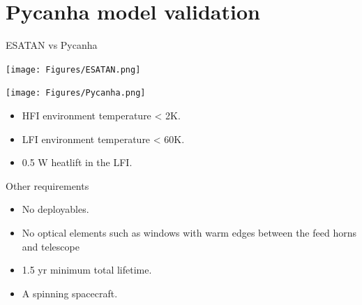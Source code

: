 \documentclass{cubeamer}
\begin{document}
\section{Pycanha model validation}

\begin{frame}{ESATAN vs Pycanha}
    \begin{minipage}{0.5\textwidth}
        \texttt{[image: Figures/ESATAN.png]} 
    \end{minipage}
    \begin{minipage}{0.5\textwidth}
        \texttt{[image: Figures/Pycanha.png]} 
    \end{minipage}

   \begin{itemize}
   \item HFI environment temperature < 2K.
   \item LFI environment temperature < 60K.
   \item 0.5 W heatlift in the LFI.
   \end{itemize}

\end{frame}

\begin{frame}{Other requirements}

   
\begin{itemize}
   \item No deployables.
   \item No optical elements such as windows with warm edges between the feed horns and telescope 
   \item 1.5 yr minimum total lifetime.
   \item A spinning spacecraft.
   \end{itemize}   
\end{frame}
\end{document}
